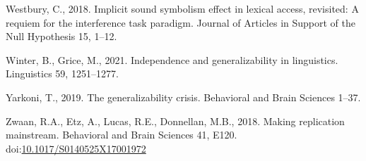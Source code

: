 \documentclass[]{elsarticle} %
\newlength{\cslhangindent}
\newlength{\cslentryspacingunit} %
\newenvironment{CSLReferences}[2] %
 {%
  \setlength{\parindent}{0pt}
  \ifodd #1
  \let\oldpar\par
  \def\par{\hangindent=\cslhangindent\oldpar}
  \fi
  \setlength{\parskip}{#2\cslentryspacingunit}
 }%
 {}
\begin{document}
\begin{CSLReferences}{1}{0}
\leavevmode\hypertarget{ref-westbury_implicit_2018}{}%
Westbury, C., 2018. Implicit sound symbolism effect in lexical access, revisited: {A} requiem for the interference task paradigm. Journal of Articles in Support of the Null Hypothesis 15, 1--12.

\leavevmode\hypertarget{ref-winter2021independence}{}%
Winter, B., Grice, M., 2021. Independence and generalizability in linguistics. Linguistics 59, 1251--1277.

\leavevmode\hypertarget{ref-yarkoni2019generalizability}{}%
Yarkoni, T., 2019. The generalizability crisis. Behavioral and Brain Sciences 1--37.

\leavevmode\hypertarget{ref-zwaan_making_2018}{}%
Zwaan, R.A., Etz, A., Lucas, R.E., Donnellan, M.B., 2018. Making replication mainstream. Behavioral and Brain Sciences 41, E120. doi:\href{https://doi.org/10.1017/S0140525X17001972}{10.1017/S0140525X17001972}

\end{CSLReferences}
\end{document}
